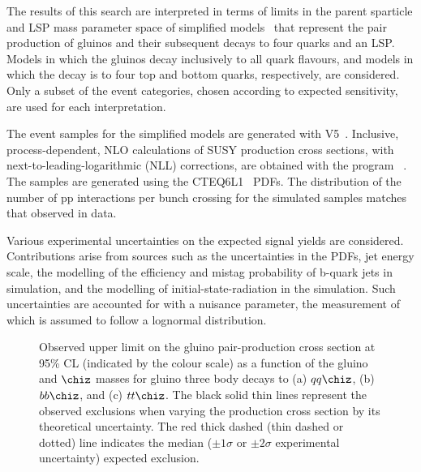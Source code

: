 The results of this search are interpreted in terms of limits in the
parent sparticle and LSP mass parameter space of simplified
models~\cite{Alwall:2008ag, Alwall:2008va, sms} that represent the pair production of gluinos and their subsequent decays to four quarks 
and an LSP. Models in which the gluinos decay inclusively to all quark flavours, and models in which the decay is to four top and bottom quarks, respectively, are considered. 
Only a subset of the event categories, chosen according to expected sensitivity, are used for
each interpretation.

The event samples for the simplified models are generated 
with \MADGRAPH V5~\cite{madgraph}.
Inclusive, process-dependent, NLO
calculations of SUSY production cross sections, with
next-to-leading-logarithmic (NLL) corrections, are obtained with the
program \PROSPINO~\cite{Beenakker:1996ch, PhysRevD.80.095004,PhysRevLett.102.111802, PhysRevD.80.095004, 1126-6708-2009-12-041,
  doi:10.1142/S0217751X11053560, susy-nlo-nll}. The samples are
generated using the CTEQ6L1~\cite{Pumplin:2002vw} PDFs. The
distribution of the number of pp interactions per bunch crossing for
the simulated samples matches that observed in data.

Various experimental uncertainties on the expected signal yields are
considered. Contributions arise from sources such as the uncertainties in the PDFs, jet energy
scale, the modelling of the efficiency and mistag probability of
b-quark jets in simulation, and the modelling of initial-state-radiation in the simulation.
Such uncertainties are accounted for with a nuisance parameter, the measurement 
of which is assumed to follow a lognormal distribution.

\begin{figure*}[tbhp]

  \begin{center}
    \caption{Observed upper limit on the gluino pair-production cross section at 95\% CL (indicated by the colour scale) as a function of the gluino
      and $\chiz$ masses for gluino three body decays to (a) $qq\chiz$, (b) $bb\chiz$, and (c) $tt\chiz$.
      The black solid thin lines represent the observed exclusions when
      varying the production cross section by its theoretical uncertainty. 
      The red thick dashed (thin dashed
      or dotted) line indicates the median (${\pm}1 \sigma$ or ${\pm}2
      \sigma$ experimental uncertainty) expected exclusion.
      \label{fig:limits-sms} }
  \end{center}
\end{figure*}


